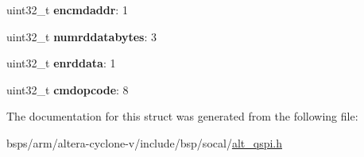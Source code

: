 \begin{DoxyCompactItemize}
\mbox{\label{structALT__QSPI__FLSHCMD__s_a6b83f047a67509e3a732f5cc4495f0f1}} 
uint32\+\_\+t {\bfseries encmdaddr}\+: 1
\item 
\mbox{\label{structALT__QSPI__FLSHCMD__s_ab32b8b60ca67fdea245928b41b08abc3}} 
uint32\+\_\+t {\bfseries numrddatabytes}\+: 3
\item 
\mbox{\label{structALT__QSPI__FLSHCMD__s_a490ab1501339ab83d7614f982d92bc08}} 
uint32\+\_\+t {\bfseries enrddata}\+: 1
\item 
\mbox{\label{structALT__QSPI__FLSHCMD__s_a241f48b62d588949e6d0d857384e36f0}} 
uint32\+\_\+t {\bfseries cmdopcode}\+: 8
\end{DoxyCompactItemize}


The documentation for this struct was generated from the following file\+:\begin{DoxyCompactItemize}
\item 
bsps/arm/altera-\/cyclone-\/v/include/bsp/socal/\mbox{\hyperlink{include_2bsp_2socal_2alt__qspi_8h}{alt\+\_\+qspi.\+h}}\end{DoxyCompactItemize}
